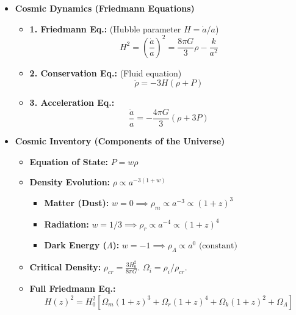 \documentclass{sciposter}
\begin{document}
\begin{multicols}{3}
\begin{itemize}
    \item \textbf{Cosmic Dynamics (Friedmann Equations)}
    \begin{itemize}
        \item \textbf{1. Friedmann Eq.:} (Hubble parameter $H = \dot{a}/a$)
        $$H^2 = \left(\frac{\dot{a}}{a}\right)^2 = \frac{8\pi G}{3}\rho - \frac{k}{a^2}$$
        \item \textbf{2. Conservation Eq.:} (Fluid equation)
        $$\dot{\rho} = -3H(\rho + P)$$
        \item \textbf{3. Acceleration Eq.:}
        $$\frac{\ddot{a}}{a} = -\frac{4\pi G}{3}(\rho + 3P)$$
    \end{itemize}

    \item \textbf{Cosmic Inventory (Components of the Universe)}
    \begin{itemize}
        \item \textbf{Equation of State:} $P = w\rho$
        \item \textbf{Density Evolution:} $\rho \propto a^{-3(1+w)}$
        \begin{itemize}
            \item \textbf{Matter (Dust):} $w=0 \implies \rho_m \propto a^{-3} \propto (1+z)^3$
            \item \textbf{Radiation:} $w=1/3 \implies \rho_r \propto a^{-4} \propto (1+z)^4$
            \item \textbf{Dark Energy ($\Lambda$):} $w=-1 \implies \rho_\Lambda \propto a^{0} \text{ (constant)}$
        \end{itemize}
        \item \textbf{Critical Density:} $\rho_{cr} = \frac{3H_0^2}{8\pi G}$. $\Omega_i = \rho_i / \rho_{cr}$.
        \item \textbf{Full Friedmann Eq.:}
        $$H(z)^2 = H_0^2 \left[ \Omega_m(1+z)^3 + \Omega_r(1+z)^4 + \Omega_k(1+z)^2 + \Omega_\Lambda \right]$$
    \end{itemize}


\end{itemize}
\end{multicols}
\end{document}
